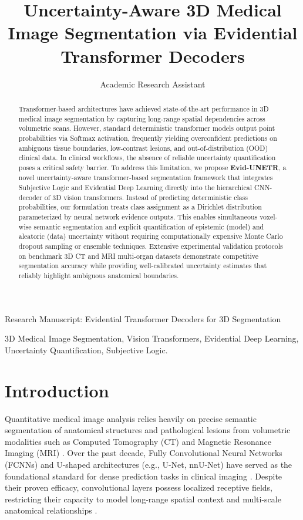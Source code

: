\documentclass[10pt,journal,compsoc]{IEEEtran}
\begin{document}
\title{Uncertainty-Aware 3D Medical Image Segmentation via Evidential Transformer Decoders}

\author{Academic Research Assistant}

%
{Research Manuscript: Evidential Transformer Decoders for 3D Segmentation}

\IEEEmaketitle

\begin{abstract}
Transformer-based architectures have achieved state-of-the-art performance in 3D medical image segmentation by capturing long-range spatial dependencies across volumetric scans. However, standard deterministic transformer models output point probabilities via Softmax activation, frequently yielding overconfident predictions on ambiguous tissue boundaries, low-contrast lesions, and out-of-distribution (OOD) clinical data. In clinical workflows, the absence of reliable uncertainty quantification poses a critical safety barrier. To address this limitation, we propose \textbf{Evid-UNETR}, a novel uncertainty-aware transformer-based segmentation framework that integrates Subjective Logic and Evidential Deep Learning directly into the hierarchical CNN-decoder of 3D vision transformers. Instead of predicting deterministic class probabilities, our formulation treats class assignment as a Dirichlet distribution parameterized by neural network evidence outputs. This enables simultaneous voxel-wise semantic segmentation and explicit quantification of epistemic (model) and aleatoric (data) uncertainty without requiring computationally expensive Monte Carlo dropout sampling or ensemble techniques. Extensive experimental validation protocols on benchmark 3D CT and MRI multi-organ datasets demonstrate competitive segmentation accuracy while providing well-calibrated uncertainty estimates that reliably highlight ambiguous anatomical boundaries.
\end{abstract}

\begin{IEEEkeywords}
3D Medical Image Segmentation, Vision Transformers, Evidential Deep Learning, Uncertainty Quantification, Subjective Logic.
\end{IEEEkeywords}

\section{Introduction}
Quantitative medical image analysis relies heavily on precise semantic segmentation of anatomical structures and pathological lesions from volumetric modalities such as Computed Tomography (CT) and Magnetic Resonance Imaging (MRI) \cite{33,38}. Over the past decade, Fully Convolutional Neural Networks (FCNNs) and U-shaped architectures (e.g., U-Net, nnU-Net) have served as the foundational standard for dense prediction tasks in clinical imaging \cite{36,21}. Despite their proven efficacy, convolutional layers possess localized receptive fields, restricting their capacity to model long-range spatial context and multi-scale anatomical relationships \cite{20}.
\end{document}

